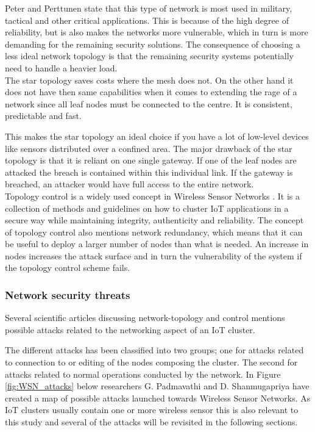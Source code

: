 Peter and Perttunen \cite{network_topologies} state that this type of network is most used in military, tactical and other critical applications. This is because of the high degree of reliability, but is also makes the networks more vulnerable, which in turn is more demanding for the remaining security solutions. The consequence of choosing a less ideal network topology is that the remaining security systems potentially need to handle a heavier load. \\

The star topology saves costs where the mesh does not. On the other hand it does not have then same capabilities when it comes to extending the rage of a network since all leaf nodes must be connected to the centre. It is consistent, predictable and fast\cite{oreilly:IoT_topology}.

This makes the star topology an ideal choice if you have a lot of low-level devices like sensors distributed over a confined area. The major drawback of the star topology is that it is reliant on one single gateway. If one of the leaf nodes are attacked the breach is contained within this individual link. If the gateway is breached, an attacker would have full access to the entire network. \\

Topology control is a widely used concept in Wireless Sensor Networks \cite{intrusion_detection}. It is a collection of methods and guidelines on how to cluster IoT applications in a secure way while maintaining integrity, authenticity and reliability. The concept of topology control also mentions network redundancy, which means that it can be useful to deploy a larger number of nodes than what is needed. An increase in nodes increases the attack surface and in turn the vulnerability of the system if the topology control scheme fails.

\subsubsection{Network security threats}
Several scientific articles \cite{electronics:topology_control}\cite{minas_gerais:topology}\cite{intrusion_detection}\cite{IJCSIS:attack_survey} discussing network-topology and control mentions possible attacks related to the networking aspect of an IoT cluster. 

The different attacks has been classified into two groups; one for attacks related to connection to or editing of the nodes composing the cluster. The second for attacks related to normal operations conducted by the network. In Figure \ref{fig:WSN_attacks} below researchers G. Padmavathi and D. Shanmugapriya \cite{IJCSIS:attack_survey} have created a map of possible attacks launched towards Wireless Sensor Networks. As IoT clusters usually contain one or more wireless sensor this is also relevant to this study and several of the attacks will be revisited in the following sections. 

